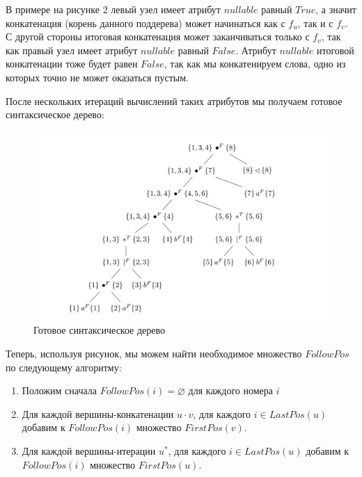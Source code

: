 \begin{multicols}{2}
В примере на рисунке $2$ левый узел имеет атрибут $nullable$ равный $True$, а значит конкатенация (корень данного поддерева) может начинаться как с $f_u$, так и с $f_v$. С другой стороны итоговая конкатенация может заканчиваться только с $f_v$, так как правый узел имеет атрибут $nullable$ равный $False$. Атрибут $nullable$ итоговой конкатенации тоже будет равен $False$, так как мы конкатенируем слова, одно из которых точно не может оказаться пустым.


После нескольких итераций вычислений таких атрибутов мы получаем готовое синтаксическое дерево:
\begin{figure}[h!t!p]
    \centering
    \includegraphics[scale=0.5]{images/FullSintTree.PNG}
    \caption{Готовое синтаксическое дерево}
    \label{fig:SyntaxTree2}
\end{figure}


Теперь, используя рисунок, мы можем найти необходимое множество $FollowPos$ по следующему алгоритму:
\begin{enumerate}
    \item Положим сначала $FollowPos(i) = \varnothing$ для каждого номера $i$
    \item Для каждой вершины-конкатенации $u\cdot v$, для каждого $i \in LastPos(u)$ добавим к $FollowPos(i)$ множество $FirstPos(v)$.
    \item Для каждой вершины-итерации $u^{*}$, для каждого $i \in LastPos(u)$ добавим к
          \\$FollowPos(i)$  множество $FirstPos(u)$.
\end{enumerate}


\end{multicols}
